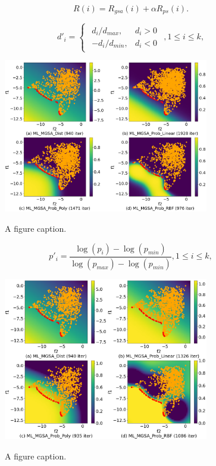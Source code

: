 \documentclass[runningheads]{llncs}
\begin{document}
\begin{equation}
    \label{eq:16}
    R(i) = R_{gsa} (i) +  \alpha R_{ps} (i).
\end{equation}


\begin{equation}
    \label{eq:17}
d'_i=
\begin{cases}
  \begin{matrix}
     d_i / d_{max}, & d_i > 0 \\
     -d_i / d_{min}, & d_i < 0 
  \end{matrix}
\end{cases}, 
1 \leq i \leq k,
\end{equation}

\begin{figure}
\center
\includegraphics[width=0.8\textwidth]{fig1.png}
\label{fig1}
\caption{A figure caption.} 
\end{figure}



\begin{equation}
    \label{eq:18}
p'_i= \frac{ \log (p_i) - \log (p_{min})}{ \log (p_{max}) - \log (p_{min})} , 1 \leq i \leq k,
\end{equation}

\begin{figure}
\center
\includegraphics[width=0.8\textwidth]{fig2.png}
\label{fig2}
\caption{A figure caption.} 
\end{figure}
\end{document}
